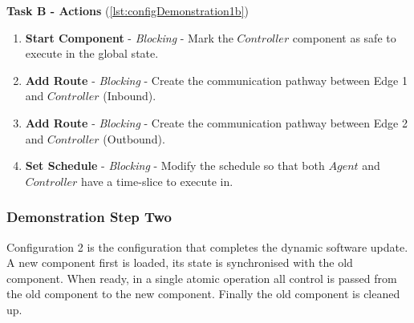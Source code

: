 \textbf{Task B - Actions} (\autoref{lst:configDemonstration1b})
 \begin{enumerate}
    \item \textbf{Start Component} - \textit{Blocking} - Mark the $Controller$ component as safe to execute in the global state.
    \item \textbf{Add Route} - \textit{Blocking} - Create the communication pathway between Edge 1 and $Controller$ (Inbound).
    \item \textbf{Add Route} - \textit{Blocking} - Create the communication pathway between Edge 2 and $Controller$ (Outbound).
    \item \textbf{Set Schedule} - \textit{Blocking} - Modify the schedule so that both $Agent$ and $Controller$ have a time-slice to execute in.
\end{enumerate}

\clearpage

\subsubsection{Demonstration Step Two}

Configuration 2 is the configuration that completes the dynamic software update. A new component first is loaded, its state is synchronised with the old component. When ready, in a single atomic operation all control is passed from the old component to the new component. Finally the old component is cleaned up.

